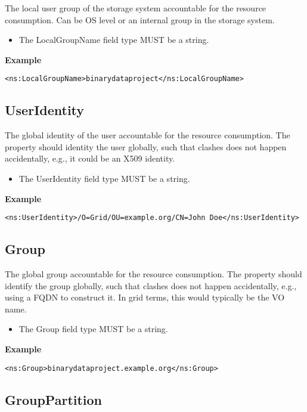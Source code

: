 The local user group of the storage system accountable for the resource
consumption. Can be OS level or an internal group in the storage system.

\begin{itemize}
\item The LocalGroupName field type MUST be a string.
\end{itemize}

{\bf Example}
\begin{verbatim}
<ns:LocalGroupName>binarydataproject</ns:LocalGroupName>
\end{verbatim}


\subsection{UserIdentity}

The global identity of the user accountable for the resource consumption. The
property should identity the user globally, such that clashes does not happen
accidentally, e.g., it could be an X509 identity.

\begin{itemize}
\item The UserIdentity field type MUST be a string.
\end{itemize}

{\bf Example}
\begin{verbatim}
<ns:UserIdentity>/O=Grid/OU=example.org/CN=John Doe</ns:UserIdentity>
\end{verbatim}


\subsection{Group}

The global group accountable for the resource consumption. The property should
identify the group globally, such that clashes does not happen accidentally,
e.g., using a FQDN to construct it. In grid terms, this would typically be the
VO name.

\begin{itemize}
\item The Group field type MUST be a string.
\end{itemize}

{\bf Example}
\begin{verbatim}
<ns:Group>binarydataproject.example.org</ns:Group>
\end{verbatim}


\subsection{GroupPartition}

